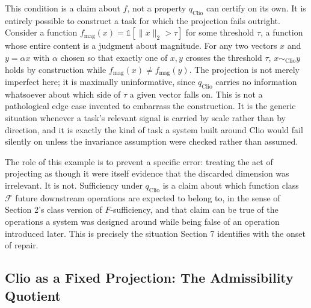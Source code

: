 \documentclass[11pt]{article}
\begin{document}
This condition is a claim about $f$, not a property $q_{\mathrm{Clio}}$ can certify on its own. It is entirely possible to construct a task for which the projection fails outright. Consider a function $f_{\mathrm{mag}}(x) = \mathbb{1}[\lVert x \rVert_2 > \tau]$ for some threshold $\tau$, a function whose entire content is a judgment about magnitude. For any two vectors $x$ and $y = \alpha x$ with $\alpha$ chosen so that exactly one of $x, y$ crosses the threshold $\tau$, $x \sim_{\mathrm{Clio}} y$ holds by construction while $f_{\mathrm{mag}}(x) \neq f_{\mathrm{mag}}(y)$. The projection is not merely imperfect here; it is maximally uninformative, since $q_{\mathrm{Clio}}$ carries no information whatsoever about which side of $\tau$ a given vector falls on. This is not a pathological edge case invented to embarrass the construction. It is the generic situation whenever a task's relevant signal is carried by scale rather than by direction, and it is exactly the kind of task a system built around Clio would fail silently on unless the invariance assumption were checked rather than assumed.

The role of this example is to prevent a specific error: treating the act of projecting as though it were itself evidence that the discarded dimension was irrelevant. It is not. Sufficiency under $q_{\mathrm{Clio}}$ is a claim about which function class $\mathcal{F}$ future downstream operations are expected to belong to, in the sense of Section 2's class version of $F$-sufficiency, and that claim can be true of the operations a system was designed around while being false of an operation introduced later. This is precisely the situation Section 7 identifies with the onset of repair.

\subsection{Clio as a Fixed Projection: The Admissibility Quotient}
\end{document}
